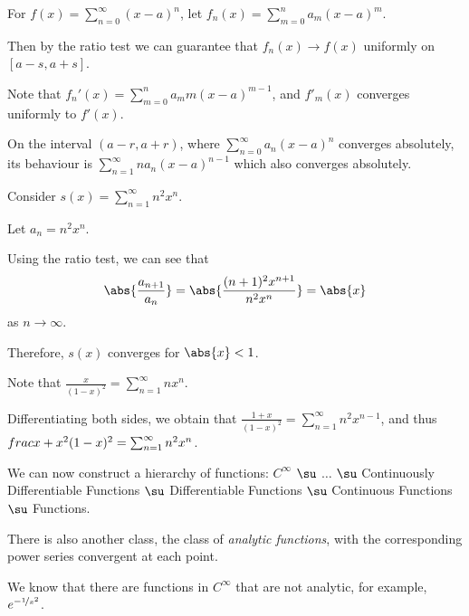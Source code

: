 \documentclass[11pt]{scrartcl}
\begin{document}
For $f(x) = \sum_{n=0}^{\infty}(x-a)^n$, let
$f_n(x) = \sum_{m=0}^na_m(x-a)^m$.

Then by the ratio test we can guarantee that $f_n(x)\to f(x)$
uniformly on $[a-s, a+s]$.

Note that $f_n'(x) = \sum_{m=0}^na_mm(x-a)^{m-1}$, and $f'_m(x)$ converges uniformly to $f'(x)$.

\begin{remark}
\hfill

  On the interval $(a-r, a+r)$, where $\sum_{n=0}^{\infty}a_n(x-a)^n$
  converges absolutely, its behaviour is
  $\sum_{n=1}^{\infty} n a_n(x-a)^{n-1}$ which also converges
  absolutely.

\end{remark}

\begin{example}

Consider $s(x) =\sum_{n=1}^{\infty} n^2x^{n}$.

Let $a_n = n^2x^n$.

Using the ratio test, we can see that
\[\abs{\frac{a_{n+1}}{a_n}} = \abs{\frac{(n+1)^2x^{n+1}}{n^2x^n}} = \abs{x}\] as $n\to \infty$.

Therefore, $s(x)$ converges for $\abs{x}< 1$.

Note that $\frac{x}{(1-x)^2} = \sum_{n=1}^{\infty}nx^n$.

Differentiating both sides, we obtain that
$\frac{1+x}{(1-x)^2}= \sum_{n=1}^{\infty}n^2x^{n-1}$, and thus
$\\frac{x+x^2}{(1-x)^2} = \sum_{n=1}^{\infty}n^2x^n$.

\end{example}

We can now construct a hierarchy of functions: $C^{\infty} $ $\su$ $\dots$ $\su$ Continuously Differentiable Functions $\su$ Differentiable Functions $\su$ Continuous Functions $\su$ Functions. 

There is also another class, the class of \textit{analytic functions},
with the corresponding power series convergent at each point.

We know that there are functions in $C^{\infty}$ that are not
analytic, for example, $e^{-\nicefrac{1}{x^{2}}}$.
\end{document}
